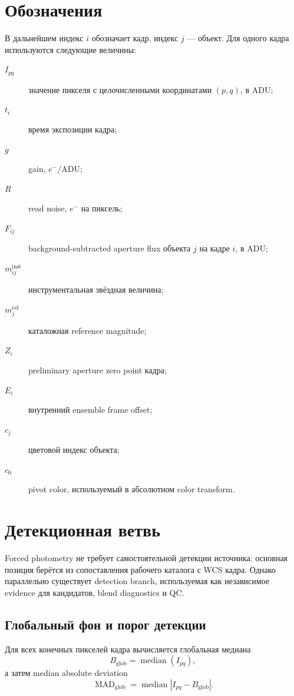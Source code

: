\section{Обозначения}

В дальнейшем индекс $i$ обозначает кадр, индекс $j$ --- объект. Для одного кадра используются следующие величины:

\begin{description}
  \item[$I_{pq}$] значение пикселя с целочисленными координатами $(p,q)$, в ADU;
  \item[$t_i$] время экспозиции кадра;
  \item[$g$] gain, $e^-/\mathrm{ADU}$;
  \item[$R$] read noise, $e^-$ на пиксель;
  \item[$F_{ij}$] background-subtracted aperture flux объекта $j$ на кадре $i$, в ADU;
  \item[$m^{\mathrm{inst}}_{ij}$] инструментальная звёздная величина;
  \item[$m^{\mathrm{ref}}_j$] каталожная reference magnitude;
  \item[$Z_i$] preliminary aperture zero point кадра;
  \item[$E_i$] внутренний ensemble frame offset;
  \item[$c_j$] цветовой индекс объекта;
  \item[$c_0$] pivot color, используемый в абсолютном color transform.
\end{description}

\section{Детекционная ветвь}
\label{sec:detection-math}

Forced photometry не требует самостоятельной детекции источника: основная позиция берётся из сопоставления рабочего каталога с WCS кадра. Однако параллельно существует detection branch, используемая как независимое evidence для кандидатов, blend diagnostics и QC.

\subsection{Глобальный фон и порог детекции}

Для всех конечных пикселей кадра вычисляется глобальная медиана
\begin{equation}
  B_{\mathrm{glob}} = \operatorname{median}(I_{pq}),
\end{equation}
а затем median absolute deviation
\begin{equation}
  \operatorname{MAD}_{\mathrm{glob}}
  = \operatorname{median}\left|I_{pq}-B_{\mathrm{glob}}\right|.
\end{equation}

